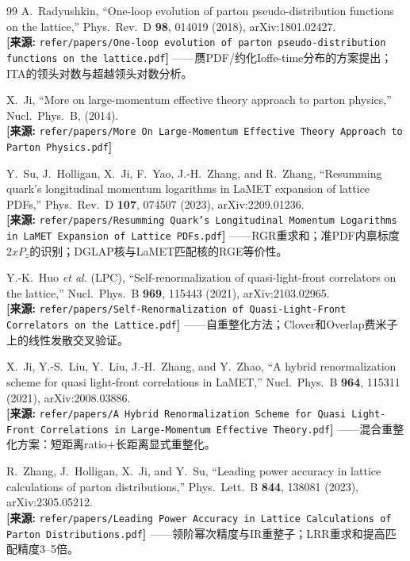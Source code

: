 \documentclass[12pt,a4paper]{ctexart}
\theoremstyle{definition}
\begin{document}
\begin{thebibliography}{99}
A.~Radyushkin, ``One-loop evolution of parton pseudo-distribution functions on the lattice,''
Phys.\ Rev.\ D \textbf{98}, 014019 (2018), arXiv:1801.02427.
\\\textbf{[来源:} \texttt{refer/papers/One-loop evolution of parton pseudo-distribution functions on the lattice.pdf}\textbf{]}
——赝PDF/约化Ioffe-time分布的方案提出；ITA的领头对数与超越领头对数分析。

X.~Ji, ``More on large-momentum effective theory approach to parton physics,''
Nucl.\ Phys.\ B, (2014).
\\\textbf{[来源:} \texttt{refer/papers/More On Large-Momentum Effective Theory Approach to Parton Physics.pdf}\textbf{]}

Y.~Su, J.~Holligan, X.~Ji, F.~Yao, J.-H.~Zhang, and R.~Zhang,
``Resumming quark's longitudinal momentum logarithms in LaMET expansion of lattice PDFs,''
Phys.\ Rev.\ D \textbf{107}, 074507 (2023), arXiv:2209.01236.
\\\textbf{[来源:} \texttt{refer/papers/Resumming Quark's Longitudinal Momentum Logarithms in LaMET Expansion of Lattice PDFs.pdf}\textbf{]}
——RGR重求和；准PDF内禀标度$2xP_z$的识别；DGLAP核与LaMET匹配核的RGE等价性。

Y.-K.~Huo \textit{et al.} (LPC),
``Self-renormalization of quasi-light-front correlators on the lattice,''
Nucl.\ Phys.\ B \textbf{969}, 115443 (2021), arXiv:2103.02965.
\\\textbf{[来源:} \texttt{refer/papers/Self-Renormalization of Quasi-Light-Front Correlators on the Lattice.pdf}\textbf{]}
——自重整化方法；Clover和Overlap费米子上的线性发散交叉验证。

X.~Ji, Y.-S.~Liu, Y.~Liu, J.-H.~Zhang, and Y.~Zhao,
``A hybrid renormalization scheme for quasi light-front correlations in LaMET,''
Nucl.\ Phys.\ B \textbf{964}, 115311 (2021), arXiv:2008.03886.
\\\textbf{[来源:} \texttt{refer/papers/A Hybrid Renormalization Scheme for Quasi Light-Front Correlations in Large-Momentum Effective Theory.pdf}\textbf{]}
——混合重整化方案：短距离ratio+长距离显式重整化。

R.~Zhang, J.~Holligan, X.~Ji, and Y.~Su,
``Leading power accuracy in lattice calculations of parton distributions,''
Phys.\ Lett.\ B \textbf{844}, 138081 (2023), arXiv:2305.05212.
\\\textbf{[来源:} \texttt{refer/papers/Leading Power Accuracy in Lattice Calculations of Parton Distributions.pdf}\textbf{]}
——领阶幂次精度与IR重整子；LRR重求和提高匹配精度3--5倍。


\end{thebibliography}
\end{document}
